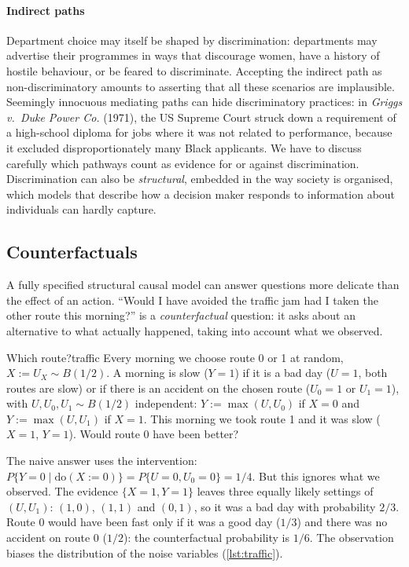 \paragraph{Indirect paths} Department choice may itself be shaped by discrimination: departments
may advertise their programmes in ways that discourage women, have a history of hostile behaviour,
or be feared to discriminate. Accepting the indirect path as non-discriminatory amounts to
asserting that all these scenarios are implausible. Seemingly innocuous mediating paths can hide
discriminatory practices: in \emph{Griggs v.\ Duke Power Co.} (1971), the US Supreme Court struck
down a requirement of a high-school diploma for jobs where it was not related to performance,
because it excluded disproportionately many Black applicants. We have to discuss carefully which
pathways count as evidence for or against discrimination. Discrimination can also be
\emph{structural}, embedded in the way society is organised, which models that describe how a
decision maker responds to information about individuals can hardly capture.

\subsection{Counterfactuals}

A fully specified structural causal model can answer questions more delicate than the effect of
an action. ``Would I have avoided the traffic jam had I taken the other route this morning?'' is a
\emph{counterfactual} question: it asks about an alternative to what actually happened, taking into
account what we observed.

\begin{example}{Which route?}{traffic}
Every morning we choose route 0 or 1 at random, $X:=U_X\sim B(1/2)$. A morning is slow ($Y=1$) if
it is a bad day ($U=1$, both routes are slow) or if there is an accident on the chosen route
($U_0=1$ or $U_1=1$), with $U,U_0,U_1\sim B(1/2)$ independent: $Y:=\max(U,U_0)$ if $X=0$ and
$Y:=\max(U,U_1)$ if $X=1$. This morning we took route 1 and it was slow
($X=1$, $Y=1$). Would route 0 have been better?

The naive answer uses the intervention: $P\{Y=0\mid\mathrm{do}(X:=0)\}=P\{U=0,U_0=0\}=1/4$. But
this ignores what we observed. The evidence $\{X=1,Y=1\}$ leaves three equally likely settings of
$(U,U_1)$: $(1,0)$, $(1,1)$ and $(0,1)$, so it was a bad day with probability $2/3$. Route 0 would
have been fast only if it was a good day ($1/3$) and there was no accident on route 0 ($1/2$):
the counterfactual probability is $1/6$. The observation biases the distribution of the noise
variables (\cref{lst:traffic}).
\end{example}

